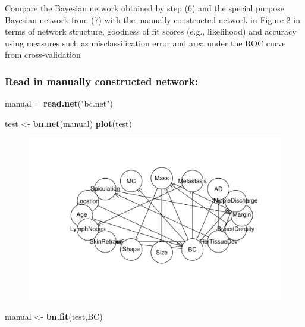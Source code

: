 \documentclass[]{article}
\newenvironment{Shaded}{\begin{snugshade}}{\end{snugshade}}
\newcommand{\KeywordTok}[1]{\textcolor[rgb]{0.13,0.29,0.53}{\textbf{{#1}}}}
\newcommand{\StringTok}[1]{\textcolor[rgb]{0.31,0.60,0.02}{{#1}}}
\newcommand{\NormalTok}[1]{{#1}}
\begin{document}
Compare the Bayesian network obtained by step (6) and the special
purpose Bayesian network from (7) with the manually constructed network
in Figure 2 in terms of network structure, goodness of fit scores (e.g.,
likelihood) and accuracy using measures such as misclassification error
and area under the ROC curve from cross-validation

\subsubsection{Read in manually constructed
network:}\label{read-in-manually-constructed-network}

\begin{Shaded}
\begin{Highlighting}[]
\NormalTok{manual =}\StringTok{ }\KeywordTok{read.net}\NormalTok{(}\StringTok{"bc.net"}\NormalTok{)}



\NormalTok{test <-}\StringTok{ }\KeywordTok{bn.net}\NormalTok{(manual)}
\KeywordTok{plot}\NormalTok{(test)}
\end{Highlighting}
\end{Shaded}

\begin{figure}[htbp]
\centering
\includegraphics{BN_Ass2_files/figure-latex/unnamed-chunk-10-1.pdf}
\end{figure}

\begin{Shaded}
\begin{Highlighting}[]
\NormalTok{manual <-}\StringTok{ }\KeywordTok{bn.fit}\NormalTok{(test,BC)}
\end{Highlighting}
\end{Shaded}
\end{document}
